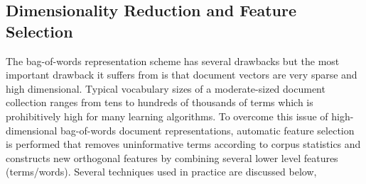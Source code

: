 
\subsection{Dimensionality Reduction and Feature Selection}
\label{sec:rw_dr}
The bag-of-words representation scheme has several drawbacks but the most important drawback it suffers from is that document vectors are very sparse and high dimensional. Typical vocabulary sizes of a moderate-sized document collection ranges from tens to hundreds of thousands of terms which is prohibitively high for many learning algorithms. 
To overcome this issue of high-dimensional bag-of-words document representations, automatic feature selection is performed that removes uninformative terms according to corpus statistics and constructs new orthogonal features by combining several lower level features (terms/words). Several techniques used in practice are discussed below, 
